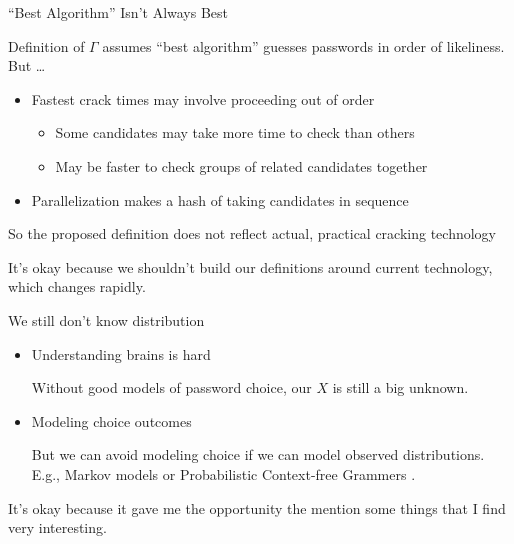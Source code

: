 \documentclass[xcolor={dvipsnames,table}]{beamer}
\newcommand\G{\ensuremath{\Gamma}}
\newcommand\itsok[1]{\vspace{0.5ex} \textcolor{Mahogany}{\colorbox{Goldenrod!20}{It's okay} because #1}}
\begin{document}
\begin{frame}{``Best Algorithm'' Isn't Always Best}

Definition of $\G$ assumes ``best algorithm'' guesses passwords in order of likeliness. But \dots
\begin{itemize}
\item Fastest crack times may involve proceeding out of order
  \begin{itemize}
  \item Some candidates may take more time to check than others
  \item May be faster to check groups of related candidates together
  \end{itemize}
\item Parallelization makes a hash of taking candidates in sequence
\end{itemize}
So the proposed definition does not reflect actual, practical cracking technology

\pause
\itsok{we shouldn't build our definitions around current technology, which changes rapidly.}

\end{frame}

\begin{frame}{We still don't know distribution}

\begin{itemize}
\item Understanding brains is hard

    Without good models of password choice, our $X$ is still a big unknown.

\item Modeling choice outcomes

    But we can avoid modeling choice if we can model observed distributions.
    E.g., Markov models \parencite[e.g.,][]{NarayananShmatikov:2005:FDA} or Probabilistic Context-free Grammers \parencite[e.g.,][]{WeirETAL2009:ProbCFGs}.
\end{itemize}

\pause
\itsok{it gave me the opportunity the mention some things that I find very interesting.}

\end{frame}
\end{document}
